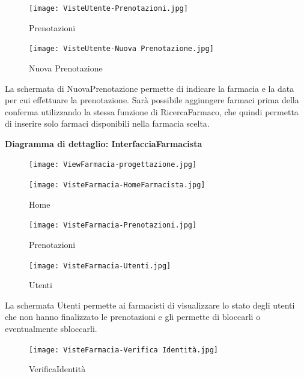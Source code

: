 \begin{figure}[h!]
    \centering
    \texttt{[image: VisteUtente-Prenotazioni.jpg]}
    \caption{Prenotazioni}
\end{figure}

\newpage

\begin{figure}[h!]
    \centering
    \texttt{[image: VisteUtente-Nuova Prenotazione.jpg]}
    \caption{Nuova Prenotazione}
\end{figure}
La schermata di NuovaPrenotazione permette di indicare la farmacia e la data
per cui effettuare la prenotazione. Sarà possibile aggiungere farmaci
prima della conferma utilizzando la stessa funzione di RicercaFarmaco, che
quindi permetta di inserire solo farmaci disponibili nella farmacia scelta.

\newpage

\textbf{Diagramma di dettaglio: InterfacciaFarmacista}
\\
\begin{figure}[h!]
    \begin{center}
        \texttt{[image: ViewFarmacia-progettazione.jpg]}
    \end{center}
\end{figure}

\begin{figure}[h!]
    \centering
    \texttt{[image: VisteFarmacia-HomeFarmacista.jpg]}
    \caption{Home}
\end{figure}
\newpage

\begin{figure}[h!]
    \centering
    \texttt{[image: VisteFarmacia-Prenotazioni.jpg]}
    \caption{Prenotazioni}
\end{figure}

\begin{figure}[h!]
    \centering
    \texttt{[image: VisteFarmacia-Utenti.jpg]}
    \caption{Utenti}
\end{figure}
La schermata Utenti permette ai farmacisti di visualizzare lo stato degli
utenti che non hanno finalizzato le prenotazioni e gli permette di bloccarli o
eventualmente sbloccarli.
\newpage

\begin{figure}[h!]
    \centering
    \texttt{[image: VisteFarmacia-Verifica Identità.jpg]}
    \caption{VerificaIdentità}
\end{figure}

\vspace{3em}

